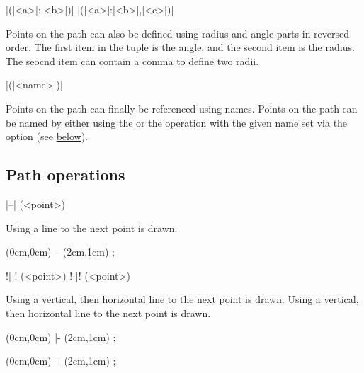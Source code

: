 \documentclass[a4paper]{article}
\begin{document}
{{\begin{macrodef}
|(|<a>|:|<b>|)|
|(|<a>|:|<b>|,|<c>|)|
\end{macrodef}
Points on the path can also be defined using radius and angle parts in reversed order. The first item in the tuple is the angle, and the second item is the radius. The seocnd item can contain a comma to define two radii.

\begin{macrodef}
|(|<name>|)|
\end{macrodef}
Points on the path can finally be referenced using names. Points on the path can be named by either using the  or the  operation with the given name set via the  option (see \hyperlink{operation:point}{below}).

\subsection{Path operations}

\begin{macrodef}
|--| (<point>)
\end{macrodef}
Using \macro{--} a line to the next point is drawn.

\begin{codeexamplecolumns}
\begin{qdraw}
  \path[stroke] (0cm,0cm)
    -- (2cm,1cm) ;
\end{qdraw}
\end{codeexamplecolumns}

\begin{macrodef}[][listing style={qdrawdocmacroalt}]
!|-! (<point>)
!-|! (<point>)
\end{macrodef}
Using \macro{|-} a vertical, then horizontal line to the next point is drawn. Using \macro{-|} a vertical, then horizontal line to the next point is drawn.

\begin{codeexamplecolumns}
\begin{qdraw}
  \path[stroke] (0cm,0cm)
    |- (2cm,1cm) ;
\end{qdraw}
\end{codeexamplecolumns}

\begin{codeexamplecolumns}
\begin{qdraw}
  \path[stroke] (0cm,0cm)
    -| (2cm,1cm) ;
\end{qdraw}
\end{codeexamplecolumns}

}}
\end{document}
